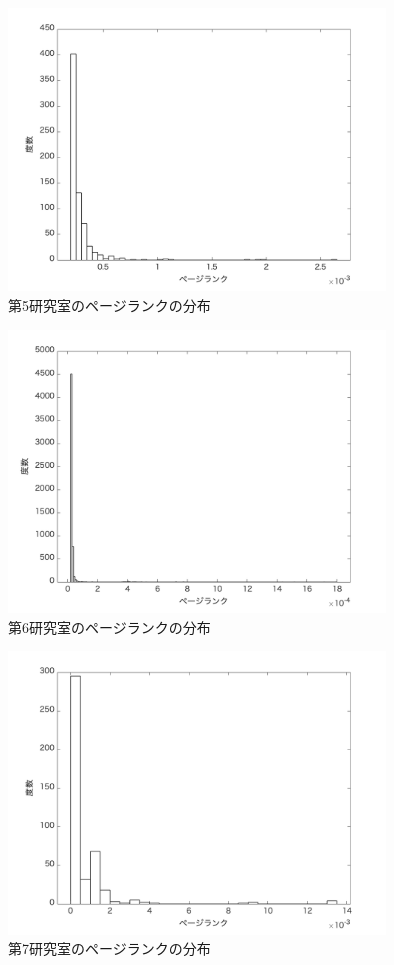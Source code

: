 \documentclass[10pt]{jarticle}
\begin{document}
\begin{figure}[H]
  \begin{center}
  \includegraphics[width=10cm]{../histograms/i5.png}
  \caption{第5研究室のページランクの分布}
  \end{center}
\end{figure}

\begin{figure}[H]
  \begin{center}
  \includegraphics[width=10cm]{../histograms/i6.png}
  \caption{第6研究室のページランクの分布}
  \end{center}
\end{figure}

\begin{figure}[H]
  \begin{center}
  \includegraphics[width=10cm]{../histograms/i7.png}
  \caption{第7研究室のページランクの分布}
  \end{center}
\end{figure}
\end{document}
